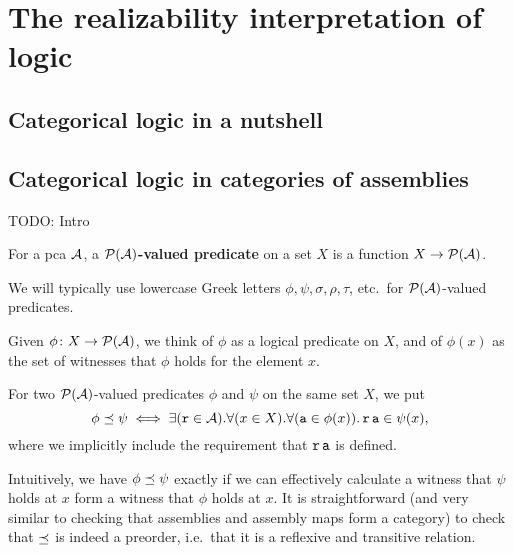 \chapter{The realizability interpretation of logic}\label{chap:logic}

\section{Categorical logic in a nutshell}

\cite{Lawvere1969}

\section{Categorical logic in categories of assemblies}

\textcolor{Mulberry}{TODO: Intro}

\begin{definition}
  For a pca \(\AA\), a \textbf{\(\PA\)-valued predicate} on a set \(X\) is a
  function \(X \to \PA\).
\end{definition}

\begin{notation}
  We will typically use lowercase Greek letters \(\phi,\psi,\sigma,\rho,\tau\),
  etc.\ for \(\PA\)-valued predicates.
\end{notation}

Given \(\phi \colon X \to \PA\), we think of \(\phi\) as a logical predicate on
\(X\), and of \(\phi(x)\) as the set of witnesses that \(\phi\) holds for the
element \(x\).

\begin{definition}
  For two \(\PA\)-valued predicates \(\phi\) and \(\psi\) on the same set \(X\),
  we put
  \[
    \phi \predleq \psi \iff
    \exists(\pca{r} \in \pca{\AA}).
    \forall (x \in X).\forall(\pca{a} \in \phi(x)).\pca{r}\pca{a} \in \psi(x),
  \]
  where we implicitly include the requirement that \(\pca{r}\pca{a}\) is defined.
\end{definition}

Intuitively, we have \(\phi \predleq \psi\) exactly if we can effectively
calculate a witness that \(\psi\) holds at \(x\) form a witness that \(\phi\)
holds at \(x\).
%
It is straightforward (and very similar to checking that assemblies and assembly
maps form a category) to check that \(\predleq\) is indeed a preorder, i.e.\
that it is a reflexive and transitive relation.

